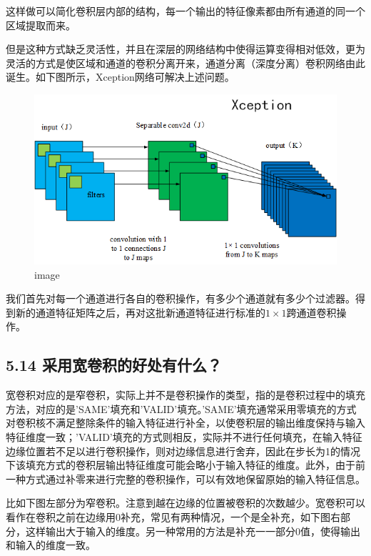 ​
这样做可以简化卷积层内部的结构，每一个输出的特征像素都由所有通道的同一个区域提取而来。

​
但是这种方式缺乏灵活性，并且在深层的网络结构中使得运算变得相对低效，更为灵活的方式是使区域和通道的卷积分离开来，通道分离（深度分离）卷积网络由此诞生。如下图所示，Xception网络可解决上述问题。

\begin{figure}
\centering
\includegraphics{./img/ch5/5.13-2.png}
\caption{image}
\end{figure}

​
我们首先对每一个通道进行各自的卷积操作，有多少个通道就有多少个过滤器。得到新的通道特征矩阵之后，再对这批新通道特征进行标准的\(1×1​\)跨通道卷积操作。

\subsection{5.14
采用宽卷积的好处有什么？}\label{ux91c7ux7528ux5bbdux5377ux79efux7684ux597dux5904ux6709ux4ec0ux4e48}

​
宽卷积对应的是窄卷积，实际上并不是卷积操作的类型，指的是卷积过程中的填充方法，对应的是'SAME'填充和'VALID'填充。'SAME'填充通常采用零填充的方式对卷积核不满足整除条件的输入特征进行补全，以使卷积层的输出维度保持与输入特征维度一致；'VALID'填充的方式则相反，实际并不进行任何填充，在输入特征边缘位置若不足以进行卷积操作，则对边缘信息进行舍弃，因此在步长为1的情况下该填充方式的卷积层输出特征维度可能会略小于输入特征的维度。此外，由于前一种方式通过补零来进行完整的卷积操作，可以有效地保留原始的输入特征信息。

​
比如下图左部分为窄卷积。注意到越在边缘的位置被卷积的次数越少。宽卷积可以看作在卷积之前在边缘用0补充，常见有两种情况，一个是全补充，如下图右部分，这样输出大于输入的维度。另一种常用的方法是补充一一部分0值，使得输出和输入的维度一致。

